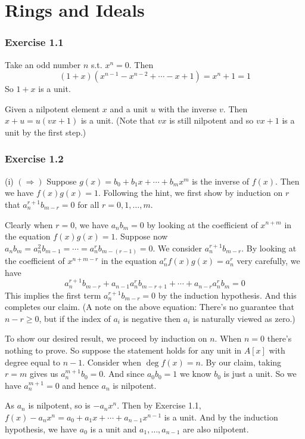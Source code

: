 \documentclass[../A&M.tex]{subfiles}
\begin{document}
\chapter{Rings and Ideals}

\subsection*{Exercise 1.1}

Take an odd number $n$ s.t. $x^n=0$. Then
$$
(1+x)(x^{n-1}-x^{n-2}+\cdots-x+1)=x^n+1=1
$$
So $1+x$ is a unit.

Given a nilpotent element $x$ and a unit $u$ with the inverse $v$. Then $x+u=u(vx+1)$ is a unit. (Note that $vx$ is still nilpotent and so $vx+1$ is a unit by the first step.)

\subsection*{Exercise 1.2}

(i) $(\Rightarrow)$ Suppose $g(x)=b_0+b_1x+\cdots+b_mx^m$ is the inverse of $f(x)$. Then we have $f(x)g(x)=1$. Following the hint, we first show by induction on $r$ that $a_n^{r+1} b_{m-r}=0$ for all $r=0,1,\ldots,m$.

Clearly when $r=0$, we have $a_n b_m=0$ by looking at the coefficient of $x^{n+m}$ in the equation $f(x)g(x)=1$. Suppose now $a_n b_m = a_n^2 b_{m-1} = \cdots = a_n^r b_{m-(r-1)} = 0$. We consider $a_n^{r+1} b_{m-r}$. By looking at the coefficient of $x^{n+m-r}$ in the equation $a_n^r f(x)g(x) = a_n^r$ very carefully, we have
$$
a_n^{r+1} b_{m-r} + a_{n-1} a_n^r b_{m-r+1} + \cdots + a_{n-r} a_n^r b_m = 0
$$
This implies the first term $a_n^{r+1} b_{m-r}=0$ by the induction hypothesis. And this completes our claim. (A note on the above equation: There's no guarantee that $n-r\geq0$, but if the index of $a_i$ is negative then $a_i$ is naturally viewed as zero.)

To show our desired result, we proceed by induction on $n$. When $n=0$ there's nothing to prove. So suppose the statement holds for any unit in $A[x]$ with degree equal to $n-1$. Consider when $\deg f(x)=n$. By our claim, taking $r=m$ gives us $a_n^{m+1} b_0=0$. And since $a_0b_0=1$ we know $b_0$ is just a unit. So we have $a_n^{m+1}=0$ and hence $a_n$ is nilpotent.

As $a_n$ is nilpotent, so is $-a_nx^n$. Then by Exercise 1.1, $f(x)-a_nx^n = a_0+a_1x+\cdots+a_{n-1}x^{n-1}$ is a unit. And by the induction hypothesis, we have $a_0$ is a unit and $a_1,\ldots,a_{n-1}$ are also nilpotent.
\end{document}

